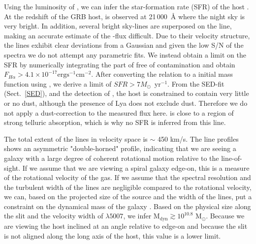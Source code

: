 \documentclass{aa}    %
\begin{document}
Using the luminosity of \ha, we can infer the star-formation rate (SFR) of the
host \citep{Kennicutt1998}. At the redshift of the GRB host, \ha{} is observed at
21\,000~\AA{} where the night sky is very bright. In addition, several bright
sky-lines are superposed on the line, making an accurate estimate of the
\ha-flux difficult. Due to their velocity structure, the lines exhibit clear
deviations from a Gaussian and given the low S/N of the spectra we do not attempt
any parametric fits. We instead obtain a limit on the SFR by numerically
integrating the part of \ha{} free of contamination and obtain $F_{H \alpha} > 4.1
\times 10^{-17} \mathrm{erg} \mathrm{s}^{-1} \mathrm{cm}^{-2}$. After converting
the \citet{Kennicutt1998} relation to a \citet{Chabrier2003} initial mass
function using \citet{Madau2014}, we derive a limit of $SFR > 7
M_\odot$~yr$^{-1}$. 
From the SED-fit
(Sect.~\ref{SED}), and the detection of \lya, the host is constrained to contain
very little or no dust, although the presence of Lya does not exclude dust.
Therefore we do not apply a dust-correction to the measured \ha{} flux here.
\oii{} is close to a region of strong telluric absorption, which is why no SFR is
inferred from this line.

The total extent of the lines in velocity space is $\sim$ 450 km/s. The line
profiles shows an asymmetric "double-horned" profile, indicating that we are
seeing a galaxy with a large degree of coherent rotational motion relative to
the line-of-sight. If we assume that we are viewing a spiral galaxy edge-on,
this is a measure of the rotational velocity of the gas. If we assume that the
spectral resolution and the turbulent width of the lines are negligible compared
to the rotational velocity, we can, based on the projected size of the source
and the width of the lines, put a constraint on the dynamical mass of the galaxy
\citep{DeBlok2014}. Based on the physical size along the slit and the velocity
width of \oiii$\lambda5007$, we infer M$_\text{dyn} \gtrsim 10^{10.8}$
M$_\odot$. Because we are viewing the host inclined at an angle relative to
edge-on and because the slit is not aligned along the long axis of the host,
this value is a lower limit. 
\end{document}

